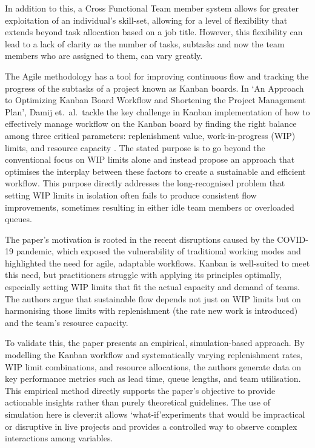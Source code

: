 \documentclass{report}
\begin{document}
In addition to this, a Cross Functional Team member system allows for greater exploitation of an individual's skill-set, allowing for a level of flexibility that extends beyond task allocation based on a job title. 
However, this flexibility can lead to a lack of clarity as the number of tasks, subtasks and now the team members who are assigned to them, can vary greatly. 

The Agile methodology has a tool for improving continuous flow and tracking the progress of the subtasks of a project known as Kanban boards. 
In `An Approach to Optimizing Kanban Board Workflow and Shortening the Project Management Plan', Damij et.\ al.\ tackle the key challenge in Kanban implementation of how to effectively manage workflow on the Kanban board by finding the right balance among three critical parameters: replenishment value, work-in-progress (WIP) limits, and resource capacity \parencite{damijApproachOptimizingKanban2024}.
The stated purpose is to go beyond the conventional focus on WIP limits alone and instead propose an approach that optimises the interplay between these factors to create a sustainable and efficient workflow. 
This purpose directly addresses the long-recognised problem that setting WIP limits in isolation often fails to produce consistent flow improvements, sometimes resulting in either idle team members or overloaded queues.

The paper's motivation is rooted in the recent disruptions caused by the COVID-19 pandemic, which exposed the vulnerability of traditional working modes and highlighted the need for agile, adaptable workflows. 
Kanban is well-suited to meet this need, but practitioners struggle with applying its principles optimally, especially setting WIP limits that fit the actual capacity and demand of teams. 
The authors argue that sustainable flow depends not just on WIP limits but on harmonising those limits with replenishment (the rate new work is introduced) and the team's resource capacity.

To validate this, the paper presents an empirical, simulation-based approach. 
By modelling the Kanban workflow and systematically varying replenishment rates, WIP limit combinations, and resource allocations, the authors generate data on key performance metrics such as lead time, queue lengths, and team utilisation. 
This empirical method directly supports the paper's objective to provide actionable insights rather than purely theoretical guidelines. 
The use of simulation here is clever:it allows `what-if'experiments that would be impractical or disruptive in live projects and provides a controlled way to observe complex interactions among variables.
\end{document}
